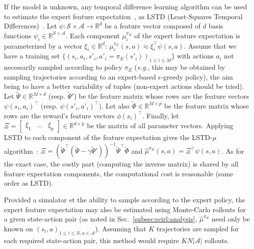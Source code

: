 \documentclass[english,utf8]{./hermes-journal}
\newcommand{\s}{\mathcal{S}}
\newcommand{\A}{\mathcal{A}}
\begin{document}
If the model is unknown, any temporal difference learning algorithm
can be used to estimate the expert feature
expectation~\cite{Klein:2011}, as LSTD (Least-Squares Temporal
Differences)~\cite{Bradtke:1996}. Let $\psi:\s\times \A \rightarrow
\mathbb{R}^d$ be a feature vector composed of $d$ basis functions
$\psi_i \in\mathbb{R}^{\s\times \A}$. Each component $\mu_i^{\pi_E}$
of the expert feature expectation is parameterized by a vector
$\xi_i\in\mathbb{R}^d$: $\mu_i^{\pi_E}(s,a)\approx \xi_i^\top
\psi(s,a)$. Assume that we have a training set
$\{(s_i,a_i,s'_i,a'_i=\pi_E(s'_i))_{1\leq i \leq M}\}$ with actions
$a_i$ not necessarily sampled according to policy $\pi_E$
(\textit{e.g.}, this may be obtained by sampling trajectories
according to an expert-based $\epsilon$-greedy policy), the aim
being to have a better variability of tuples (non-expert actions
should be tried). Let $\tilde{\Psi}\in \mathbb{R}^{M\times d}$
(resp. $\tilde{\Psi}'$) be the feature matrix whose rows are the
feature vectors $\psi(s_i,a_i)^\top$ (resp. $\psi(s'_i,a'_i)^\top$).
Let also $\tilde{\Phi}\in \mathbb{R}^{M\times p}$ be the feature
matrix whose rows are the reward's feature vectors $\phi(s_i)^\top$.
Finally, let $\Xi =
\begin{bmatrix}   \xi_1 & \dots & \xi_p
\end{bmatrix}\in\mathbb{R}^{d\times p}$ be the matrix of all
parameter vectors. Applying LSTD to each component of the feature
expectation gives the LSTD-$\mu$ algorithm~\cite{Klein:2011}: $\Xi =
(\tilde{\Psi}^\top(\tilde{\Psi} - \gamma
\tilde{\Psi}'))^{-1}\tilde{\Psi}^\top \tilde{\Phi}$ and
$\hat{\mu}^{\pi_E}(s,a) = \Xi^\top \psi(s,a)$.
As for the exact case, the costly part (computing the inverse
matrix) is shared by all feature expectation components, the
computational cost is reasonable (same order as LSTD).

%
Provided a simulator et the ability to sample according to the
expert policy, the expert feature expectation may also be estimated
using Monte-Carlo rollouts for a given state-action pair (as noted
in Sec.~\ref{subsec:scirl:analysis}, $\hat{\mu}^{\pi_E}$ need only
be known on $(s_i,a)_{1\leq i\leq N,a\in\A}$). Assuming that $K$
trajectories are sampled for each required state-action pair, this
method would require $KN|\A|$ rollouts.
\end{document}
